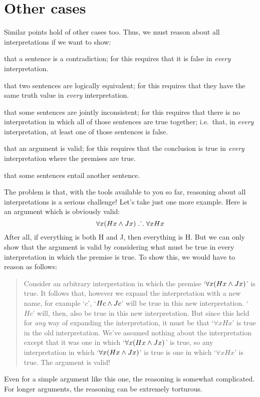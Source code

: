 \section{Other cases}
Similar points hold of other cases too. Thus, we must reason about all interpretations if we want to show:
	\begin{ebullet}
		\item that a sentence is a contradiction; for this requires that it is false in \emph{every} interpretation. 
		\item that two sentences are logically equivalent; for this requires that they have the same truth value in \emph{every} interpretation.
		\item that some sentences are jointly inconsistent; for this requires that there is no interpretation in which all of those sentences are true together; i.e.\ that, in \emph{every} interpretation, at  least one of those sentences is false.
		\item that an argument is valid; for this requires that the conclusion is true in \emph{every} interpretation where the premises are true. 
		\item that some sentences entail another sentence.
	\end{ebullet}
The problem is that, with the tools available to you so far, reasoning about all interpretations is a serious challenge! Let's take just one more example. Here is an argument which is obviously valid:
	$$\forall x(Hx \wedge Jx) \mathrel{\ldotp\dot{}\,\ldotp} \forall x Hx$$
After all, if everything is both H and J, then everything is H. But we can only show that the argument is valid by considering what must be true in every interpretation in which the premise is true. To show this, we would have to reason as follows:
	\begin{quote}
		Consider an arbitrary interpretation in which the premise `$\forall x(Hx \wedge Jx)$' is true. It follows that, however we expand the interpretation with a new name, for example `$c$', `$Hc \wedge Jc$' will be true in this new interpretation. `$Hc$' will, then, also be true in this new interpretation. But since this held for \emph{any} way of expanding the interpretation, it must be that `$\forall x Hx$' is true in the old interpretation. We've assumed nothing about the interpretation except that it was one in which `$\forall x(Hx \wedge Jx)$'  is true, so any interpretation in which `$\forall x(Hx \wedge Jx)$' is true is one in which `$\forall x Hx$' is true. The argument is valid!
\end{quote}
Even for a simple argument like this one, the reasoning is somewhat complicated. For longer arguments, the reasoning can be extremely torturous.

